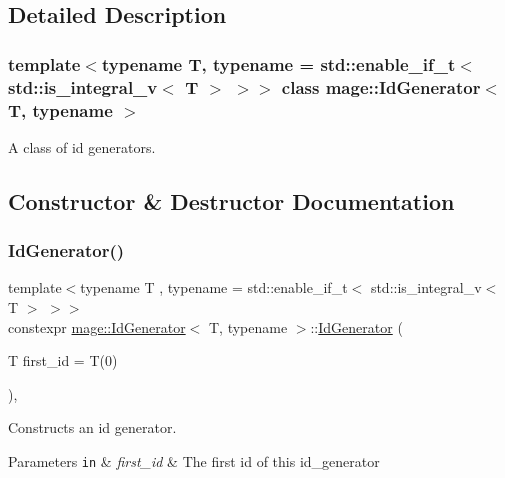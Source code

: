 \subsection{Detailed Description}
\subsubsection*{template$<$typename T, typename = std\+::enable\+\_\+if\+\_\+t$<$ std\+::is\+\_\+integral\+\_\+v$<$ T $>$ $>$$>$\newline
class mage\+::\+Id\+Generator$<$ T, typename $>$}

A class of id generators. 

\subsection{Constructor \& Destructor Documentation}
\mbox{\label{classmage_1_1_id_generator_a8a8af49fb938745d014bfdf9ccf65142}} 
\subsubsection{\texorpdfstring{Id\+Generator()}{IdGenerator()}\hspace{0.1cm}{\footnotesize\ttfamily [1/3]}}
{\footnotesize\ttfamily template$<$typename T , typename  = std\+::enable\+\_\+if\+\_\+t$<$ std\+::is\+\_\+integral\+\_\+v$<$ T $>$ $>$$>$ \\
constexpr \mbox{\hyperlink{classmage_1_1_id_generator}{mage\+::\+Id\+Generator}}$<$ T, typename $>$\+::\mbox{\hyperlink{classmage_1_1_id_generator}{Id\+Generator}} (\begin{DoxyParamCaption}\item[{T}]{first\+\_\+id = {\ttfamily T(0)} }\end{DoxyParamCaption})\hspace{0.3cm}{\ttfamily [explicit]}, {\ttfamily [noexcept]}}

Constructs an id generator.


\begin{DoxyParams}[1]{Parameters}
\mbox{\tt in}  & {\em first\+\_\+id} & The first id of this id\+\_\+generator \\
\hline
\end{DoxyParams}
\mbox{\label{classmage_1_1_id_generator_aa0beb004264991856911f8718748a9c1}} 
